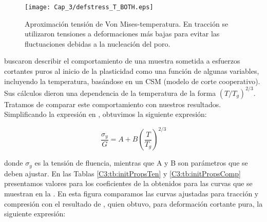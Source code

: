 \begin{figure}[htp]
\centering
\texttt{[image: Cap\_3/defstress\_T\_BOTH.eps]}
\caption[Aproximación tensión de Von Mises-temperatura]{Aproximación tensión de Von Mises-temperatura. En tracción se utilizaron tensiones a deformaciones más bajas para evitar las fluctuaciones debidas a la nucleación del poro.}
\label{C3:fg:peakVMises1218VsT}
\end{figure} 

\cite{cheng11} buscaron describir el comportamiento de una muestra sometida a esfuerzos cortantes puros al inicio de la plasticidad  como una función de algunas variables, incluyendo la temperatura, basándose en un CSM (modelo de corte cooperativo). Sus cálculos dieron una dependencia de la temperatura de la forma $(T/T_g)^{2/3}$. Tratamos de comparar este comportamiento con nuestros resultados. Simplificando la expresión en \cite{cheng11}, obtuvimos la siguiente expresión:


\begin{equation}\label{C3:eq:onsetPlast}
\frac{\sigma{}_{y}}{G} = A+B\left( \frac{T}{T_g} \right)^{2/3}
\end{equation}

donde $\sigma{}_{y}$ es la tensión de fluencia, mientras que A y B son parámetros que se deben ajustar. En las Tablas \ref{C3:tb:initPropsTen} y \ref{C3:tb:initPropsComp} presentamos valores para los coeficientes de la  obtenidos para las curvas que se muestran en la . En esta figura comparamos las curvas ajustadas para tracción y compresión con el resultado de \cite{johnson05}, quien obtuvo, para deformación cortante pura, la siguiente expresión:


